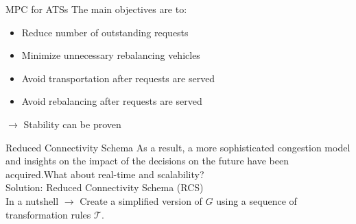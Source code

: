 \begin{frame}{MPC for ATSs}
The main objectives are to:
\vspace{0.1cm}
\hspace{9.5 cm}
\begin{itemize}
	\item Reduce number of outstanding requests 
	\item Minimize unnecessary rebalancing vehicles 
	\vspace{0.2cm}
	\item Avoid transportation after requests are served 
	\item Avoid rebalancing after requests are served 
\end{itemize}
\vspace{0.7cm}
$\rightarrow$ Stability can be proven
\end{frame}
\begin{frame}{Reduced Connectivity Schema}
	As a result, a more sophisticated congestion model and insights on the impact of the decisions on the future have been acquired.What about real-time and scalability?\\
	\vspace{0.5cm}
	Solution: Reduced Connectivity Schema (RCS)\\
	In a nutshell $\rightarrow$ Create a simplified version of $G$  using a sequence of transformation rules $\mathcal{T}$.
\end{frame}
